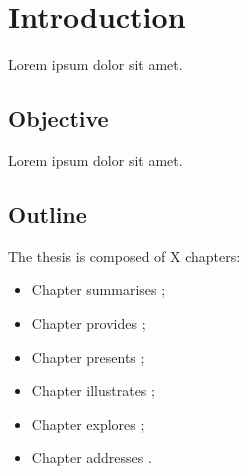 \chapter{Introduction}
\label{chap:intro}



Lorem ipsum dolor sit amet.




\section{Objective}
\label{sec:objective}

Lorem ipsum dolor sit amet.




\section{Outline}
\label{sec:outline}

The thesis is composed of X chapters:
\begin{itemize}
	\item Chapter summarises ;
	
	\item Chapter provides ;
	
	\item Chapter presents ;
		
	\item Chapter illustrates ;

	\item Chapter explores ;	
	
	\item Chapter addresses .
\end{itemize}





